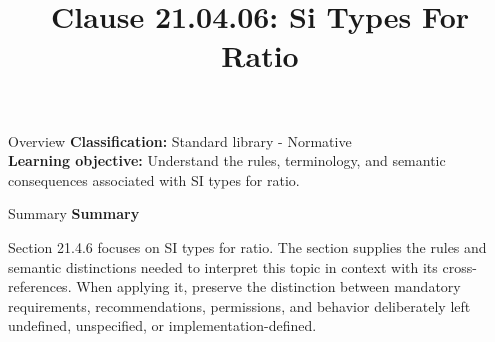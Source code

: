 \documentclass[10pt,letterpaper]{article}
\title{Clause 21.04.06: Si Types For Ratio}
\author{}
\date{}
\begin{document}
\maketitle
\begin{CornellOverviewBox}{Overview}
\textbf{Classification:} Standard library - Normative\\[2pt]
\textbf{Learning objective:} Understand the rules, terminology, and semantic consequences associated with SI types for ratio.
\end{CornellOverviewBox}\begin{CornellSummaryBox}{Summary}
{\sffamily\bfseries\color{Accent} Summary}\par\vspace{3pt}Section 21.4.6 focuses on SI types for ratio. The section supplies the rules and semantic distinctions needed to interpret this topic in context with its cross-references. When applying it, preserve the distinction between mandatory requirements, recommendations, permissions, and behavior deliberately left undefined, unspecified, or implementation-defined.
\end{CornellSummaryBox}
\end{document}
